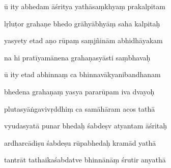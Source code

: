 \documentclass[article,12pt,a4paper]{memoir}%
\newcounter{parCount}
\begin{document}
	  
	  \pstart {} ū ity abhedam āśritya yathāsaṃkhyaṃ prakalpitam 
	{}
	\pend%
      

	  
	  \pstart \leavevmode%
	lṛluṭor grahaṇe bhedo grāhyābhyāṃ saha kalpitaḥ 
	{}
	\pend%
      

	  
	  \pstart {} yasyety etad aṇo rūpaṃ saṃjñinām abhidhāyakam 
	{}
	\pend%
      

	  
	  \pstart \leavevmode%
	na hi pratīyamānena grahaṇasyāsti saṃbhavaḥ 
	{}
	\pend%
      

	  
	  \pstart {} ū ity etad abhinnaṃ ca bhinnavākyanibandhanam 
	{}
	\pend%
      

	  
	  \pstart \leavevmode%
	bhedena grahaṇaṃ yasya pararūpam iva dvayoḥ 
	{}
	\pend%
      

	  
	  \pstart {} plutasyāṅgavivṛddhiṃ ca samāhāram acos tathā 
	{}
	\pend%
      

	  
	  \pstart \leavevmode%
	vyudasyatā punar bhedaḥ śabdeṣv atyantam āśritaḥ 
	{}
	\pend%
      

	  
	  \pstart {} ardharcādiṣu śabdeṣu rūpabhedaḥ kramād yathā 
	{}
	\pend%
      

	  
	  \pstart \leavevmode%
	tantrāt tathaikaśabdatve bhinnānāṃ śrutir anyathā 
	{}
	\pend%
      
\end{document}
